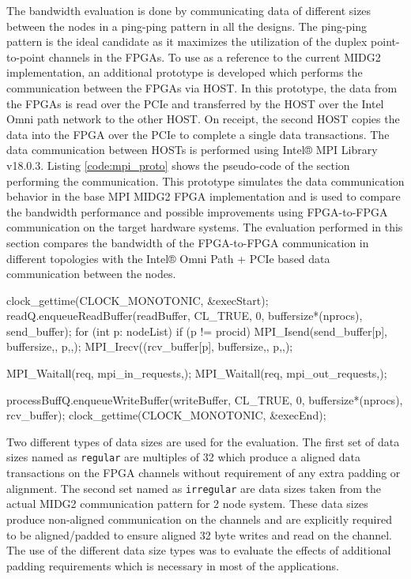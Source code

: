 The bandwidth evaluation is done by communicating data of different
sizes between the nodes in a ping-ping pattern in all the designs.
The ping-ping pattern is the ideal candidate as it maximizes
the utilization of the duplex point-to-point channels in the
FPGAs. To use as a reference to the current MIDG2 implementation,
an additional prototype is developed which performs the communication
between the FPGAs via HOST. In this prototype, the data from the FPGAs
is read over the PCIe and transferred by the HOST over the Intel
Omni path network to the other HOST. On receipt, the second HOST
copies the data into the FPGA over the PCIe to complete a single data
transactions. The data communication between HOSTs is performed using
Intel® MPI Library v18.0.3. Listing \ref{code:mpi_proto} shows the pseudo-code of the section
performing the communication. This prototype simulates the data communication
behavior in the base MPI MIDG2 FPGA implementation and is used to compare the
bandwidth performance and possible improvements using FPGA-to-FPGA communication
on the target hardware systems. The evaluation performed in this
section compares the bandwidth of the FPGA-to-FPGA communication
in  different topologies with the Intel® Omni Path + PCIe based
data communication between the nodes.

\begin{CppCode}[caption=Pseudo-code to perform MPI+PCIe based data communication
    between FPGAs, frame=tlrb, label=code:mpi_proto]
clock_gettime(CLOCK_MONOTONIC, &execStart);
readQ.enqueueReadBuffer(readBuffer, CL_TRUE, 0, buffersize*(nprocs), send_buffer);
for (int p: nodeList)
{
    if (p != procid)
    {
        MPI_Isend(send_buffer[p], buffersize,, p,,);
        MPI_Irecv((rcv_buffer[p], buffersize,, p,,);
    }
}

MPI_Waitall(req, mpi_in_requests,);
MPI_Waitall(req, mpi_out_requests,);

processBuffQ.enqueueWriteBuffer(writeBuffer, CL_TRUE, 0, buffersize*(nprocs), rcv_buffer);
clock_gettime(CLOCK_MONOTONIC, &execEnd);
\end{CppCode}

Two different types of data sizes are used for the evaluation. The first set of data
sizes named as \texttt{regular} are multiples of 32 which produce a aligned data transactions
on the FPGA channels without requirement of any extra padding or alignment.
The second set named as \texttt{irregular} are data sizes taken from the actual
MIDG2 communication pattern for 2 node system. These data sizes produce
non-aligned communication on the channels and are explicitly required to be
aligned/padded to ensure aligned 32 byte writes and read on the channel.
The use of the different data size types was to evaluate the effects of additional
padding requirements which is necessary in most of the applications.

